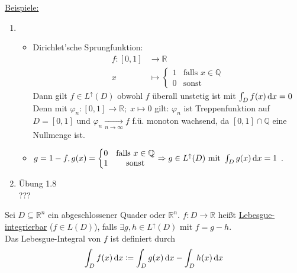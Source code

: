 \underline{Beispiele:}\\
\begin{enumerate}
	\item \begin{itemize}
		\item Dirichlet'sche Sprungfunktion:\\
	\begin{align*}
		f\colon [0,1] &\to \mathbb{R}\\
		x&\mapsto \left\{\begin{matrix}
			1 & \text{falls } x \in\mathbb{Q}\\
			0 & \text{sonst}
		\end{matrix}\right.
	\end{align*}
	Dann gilt $f\in L^\uparrow(D)$ obwohl $f$ überall unstetig ist mit $\int_D f(x) \,\text{d}x=0$\\
	Denn mit $\varphi_n\colon [0, 1]\to \mathbb{R};\;x\mapsto 0$ gilt: $\varphi_n$ ist Treppenfunktion auf $D=[0,1]$ und $\varphi_n\xrightarrow[n\to\infty]{}f$ f.ü. monoton wachsend, da $[0,1]\cap\mathbb{Q}$ eine Nullmenge ist.

	\item $g=1-f, g(x)=\left\{\begin{matrix}
		0 & \text{falls }  x \in\mathbb{Q}\\
		1 & \text{sonst}
	\end{matrix}\right.\Rightarrow g\in L^\uparrow(D)\ \text{mit}\ \integ{D}{g(x)}=1$ .
	\end{itemize}
	\item Übung 1.8\\
	???
\end{enumerate}

\begin{definition}
	Sei $D\subseteq\mathbb{R}^n$ ein abgeschlossener Quader oder $\mathbb{R}^n$. $f\colon D\to\mathbb{R}$ heißt \underline{Lebesgue-integrierbar} ($f\in L(D)$), falls $\exists g,h\in L^\uparrow(D)$ mit $f=g-h$.\\
	Das Lebesgue-Integral von $f$ ist definiert durch
	\[
		\int_D f(x) \,\text{d}x\coloneqq\int_D g(x) \,\text{d}x-\int_D h(x) \,\text{d}x	
	\]
\end{definition}

